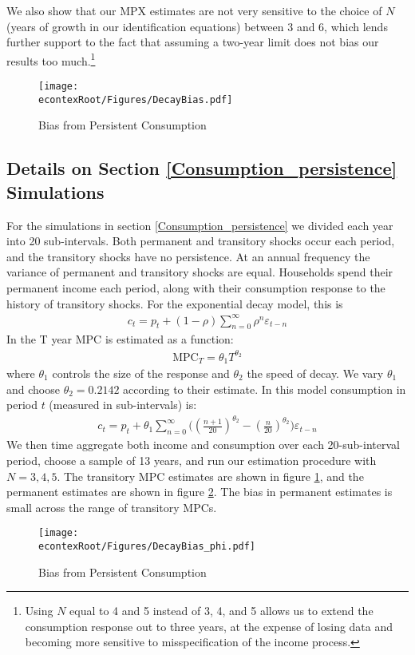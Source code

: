 \documentclass[titlepage]{\econtex}\newcommand{\texname}{ConsumptionHeterogeneity}
\begin{document}
	We also show that our MPX estimates are not very sensitive to the choice of $N$ (years of growth in our identification equations) between 3 and 6, which lends further support to the fact that assuming a two-year limit does not bias our results too much.\footnote{Using $N$ equal to 4 and 5 instead of 3, 4, and 5 allows us to extend the consumption response out to three years, at the expense of losing data and becoming more sensitive to misspecification of the income process.}
	\begin{figure} 
		\begin{centering}
			\texttt{[image: \\econtexRoot/Figures/DecayBias.pdf]}
			\caption{Bias from Persistent Consumption}
			\label{fig:DecayBias}
		\end{centering}
	\end{figure}
	
	\subsection{Details on Section \ref{Consumption_persistence} Simulations}
	For the simulations in section \ref{Consumption_persistence} we divided each year into 20 sub-intervals. Both permanent and transitory shocks occur each period, and the transitory shocks have no persistence. At an annual frequency the variance of permanent and transitory shocks are equal. Households spend their permanent income each period, along with their consumption response to the history of transitory shocks. For the exponential decay model, this is
	\begin{align*}
	c_t = p_t + (1-\rho)\sum_{n=0}^{\infty}\rho^n \varepsilon_{t-n}
	\end{align*}
	In  the T year MPC is estimated as a function:
	\begin{align*}
	\text{MPC}_T = \theta_1 T^{\theta_2}
	\end{align*}
	where $\theta_1$ controls the size of the response and $\theta_2$ the speed of decay. We vary $\theta_1$ and choose $\theta_2= 0.2142$ according to their estimate. In this model consumption in period $t$ (measured in sub-intervals) is:
	\begin{align*}
	c_t = p_t + \theta_1\sum_{n=0}^{\infty}\Big( (\frac{n+1}{20})^{\theta_2} -(\frac{n}{20})^{\theta_2} \Big)\varepsilon_{t-n}
	\end{align*}
	We then time aggregate both income and consumption over each 20-sub-interval period, choose a sample of 13 years, and run our estimation procedure with $N=3,4,5$. The transitory MPC estimates are shown in figure \ref{fig:DecayBias}, and the permanent estimates are shown in figure \ref{fig:DecayBias_phi}. The bias in permanent estimates is small across the range of transitory MPCs.
	\begin{figure} 
		\begin{centering}
			\texttt{[image: \\econtexRoot/Figures/DecayBias\_phi.pdf]}
			\caption{Bias from Persistent Consumption}
			\label{fig:DecayBias_phi}
		\end{centering}
	\end{figure}
\end{document}
